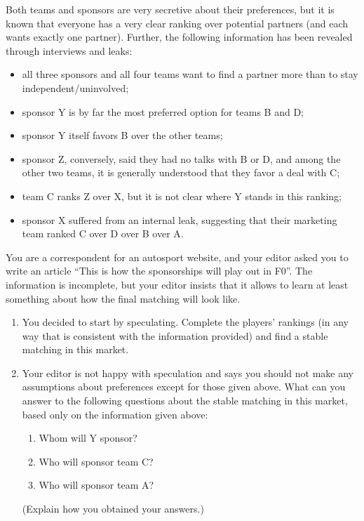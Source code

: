 \documentclass[a4paper]{article}
\begin{document}
Both teams and sponsors are very secretive about their preferences, but
it is known that everyone has a very clear ranking over potential
partners (and each wants exactly one partner). Further, the following 
information has been revealed through interviews and leaks:
\begin{itemize}
	\item all three sponsors and all four teams want to find a partner more
	than to stay independent/uninvolved;
	\item sponsor Y is by far the most preferred option for teams B and D;
	\item sponsor Y itself favors B over the other teams;
	\item sponsor Z, conversely, said they had no talks with B or D, and
	among the other two teams, it is generally understood that they favor a
	deal with C;
	\item team C ranks Z over X, but it is not clear where Y stands in this
	ranking;
	\item sponsor X suffered from an internal leak, suggesting that their
	marketing team ranked C over D over B over A.
\end{itemize}
You are a correspondent for an autosport website, and your editor asked
you to write an article ``This is how the sponsorships will play out in
F0''. The information is incomplete, but your editor insists that it
allows to learn at least something about how the final matching will
look like.

\begin{enumerate}
	\item You decided to start by speculating. Complete the players'
	rankings (in any way that is consistent with the information provided) and find a
	stable matching in this market.
	
	\item Your editor is not happy with speculation and says you should not make
	any assumptions about preferences except for those given above. What can
	you answer to the following questions about the stable matching in this
	market, based only on the information given above:
	\begin{enumerate}
		\item Whom will Y sponsor?
		\item Who will sponsor team C?
		\item Who will sponsor team A?
	\end{enumerate}
	(Explain how you obtained your answers.)
\end{enumerate}
\end{document}
